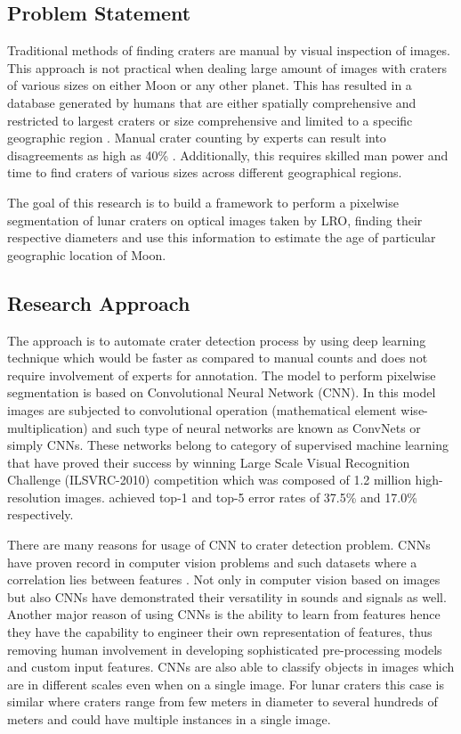 \documentclass[11pt]{article}
\begin{document}
\subsection{Problem Statement}
Traditional methods of finding craters are manual by visual inspection of images. This approach is not practical when dealing large amount of images with craters of various sizes on either Moon or any other planet. This has resulted in a database generated by humans that are either spatially comprehensive and restricted to largest craters or size comprehensive and limited to a specific geographic region \cite{stepinski2012detecting}. Manual crater counting by experts can result into disagreements as high as 40\% \cite{greeley1970precision}. Additionally, this requires skilled man power and time to find craters of various sizes across different geographical regions.

The goal of this research is to build a framework to perform a pixelwise segmentation of lunar craters on optical images taken by LRO, finding their respective diameters and use this information to estimate the age of particular geographic location of Moon.

\subsection{Research Approach}
The approach is to automate crater detection process by using deep learning technique which would be faster as compared to manual counts and does not require involvement of experts for annotation. The model to perform pixelwise segmentation is based on Convolutional Neural Network (CNN). In this model images are subjected to convolutional operation (mathematical element wise-multiplication) and such type of neural networks are known as ConvNets or simply CNNs. These networks belong to category of supervised machine learning that have proved their success by winning Large Scale Visual Recognition Challenge (ILSVRC-2010) competition which was composed of 1.2 million high-resolution images. \cite{krizhevsky2012imagenet} achieved top-1 and top-5 error rates of 37.5\% and 17.0\% respectively.

There are many reasons for usage of CNN to crater detection problem. CNNs have proven record in computer vision problems and such datasets where a correlation lies between features \cite{long2015fully}. Not only in computer vision based on images but also CNNs have demonstrated their versatility in sounds and signals as well. Another major reason of using CNNs is the ability to learn from features hence they have the capability to engineer their own representation of features, thus removing human involvement in developing sophisticated pre-processing models and custom input features. CNNs are also able to classify objects in images which are in different scales even when on a single image. For lunar craters this case is similar where craters range from few meters in diameter to several hundreds of meters and could have multiple instances in a single image.
\end{document}
